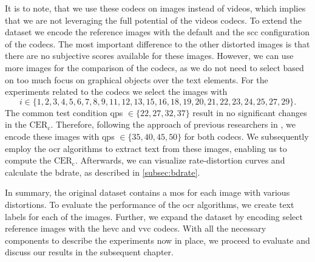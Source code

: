 It is to note, that we use these codecs on images instead of videos, which implies that we are not leveraging the full potential of the videos codecs.
To extend the dataset we encode the reference images with the default and the \gls{scc} configuration of the codecs.
The most important difference to the other distorted images is that there are no subjective scores available for these images.
However, we can use more images for the comparison of the codecs, as we do not need to select based on too much focus on graphical objects over the text elements.
For the experiments related to the codecs we select the images with
\begin{equation}
    i \in \{1, 2, 3, 4, 5, 6, 7, 8, 9, 11, 12, 13, 15, 16, 18, 19, 20, 21, 22, 23, 24, 25, 27, 29\}.
\end{equation}
The common test condition \glspl{qp} $\in \{22, 27, 32, 37\}$ result in no significant changes in the $\text{CER}_{\text{c}}$.
Therefore, following the approach of previous researchers in \cite{ultra_low_bitrate_2022}, we encode these images with \glspl{qp} $\in \{35, 40, 45, 50\}$ for both codecs.
We subsequently employ the \gls{ocr} algorithms to extract text from these images, enabling us to compute the $\text{CER}_{\text{c}}$.
Afterwards, we can visualize rate-distortion curves and calculate the \gls{bdrate}, as described in \autoref{subsec:bdrate}.

In summary, the original dataset contains a \gls{mos} for each image with various distortions.
To evaluate the performance of the \gls{ocr} algorithms, we create text labels for each of the images.
Further, we expand the dataset by encoding select reference images with the \gls{hevc} and \gls{vvc} codecs.
With all the necessary components to describe the experiments now in place, we proceed to evaluate and discuss our results in the subsequent chapter.
